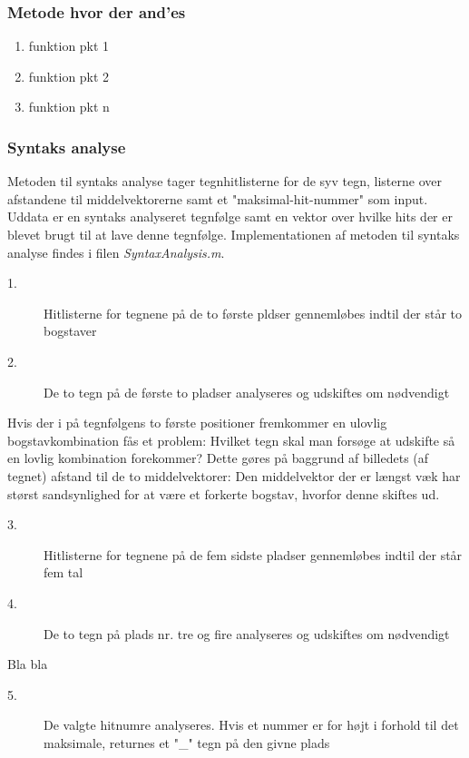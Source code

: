 \subsubsection{Metode hvor der and'es}

\begin{enumerate}
\item funktion pkt 1
\item funktion pkt 2
\item funktion pkt n
\end{enumerate}

\subsubsection{Syntaks analyse}

Metoden til syntaks analyse tager tegnhitlisterne for de syv tegn, listerne over afstandene til middelvektorerne samt et "maksimal-hit-nummer" som input. Uddata er en syntaks analyseret tegnfølge samt en vektor over hvilke hits der er blevet brugt til at lave denne tegnfølge. Implementationen af metoden til syntaks analyse findes i filen \textit{SyntaxAnalysis.m}.

\begin{description}
\item[1.] Hitlisterne for tegnene på de to første pldser gennemløbes indtil der står to bogstaver
\item[2.] De to tegn på de første to pladser analyseres og udskiftes om nødvendigt
\end{description}

Hvis der i på tegnfølgens to første positioner fremkommer en ulovlig bogstavkombination fås et problem: Hvilket tegn skal man forsøge at udskifte så en lovlig kombination forekommer? Dette gøres på baggrund af billedets (af tegnet) afstand til de to middelvektorer: Den middelvektor der er længst væk har størst sandsynlighed for at være et forkerte bogstav, hvorfor denne skiftes ud.

\begin{description}
\item[3.] Hitlisterne for tegnene på de fem sidste pladser gennemløbes indtil der står fem tal
\item[4.] De to tegn på plads nr. tre og fire analyseres og udskiftes om nødvendigt
\end{description}

Bla bla

\begin{description}
\item[5.] De valgte hitnumre analyseres. Hvis et nummer er for højt i forhold til det maksimale, returnes et "\_" tegn på den givne plads
\end{description}

